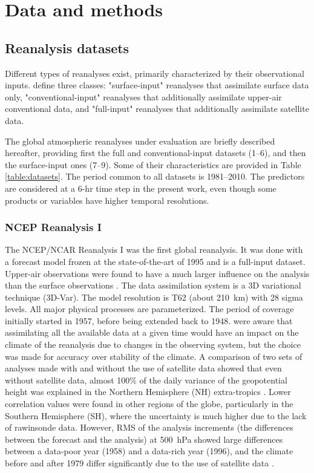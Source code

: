 \documentclass{ametsoc}
\begin{document}
	
	\section{Data and methods}
	\label{sec:data}
	
	\subsection{Reanalysis datasets}
	
	Different types of reanalyses exist, primarily characterized by their observational inputs. \citet{Fujiwara2017} define three classes: "surface-input" reanalyses that assimilate surface data only, "conventional-input" reanalyses that additionally assimilate upper-air conventional data, and "full-input" reanalyses that additionally assimilate satellite data.
	
	The global atmospheric reanalyses under evaluation are briefly described hereafter, providing first the full and conventional-input datasets (1--6), and then the surface-input ones (7--9). Some of their characteristics are provided in Table \ref{table:datasets}. The period common to all datasets is 1981--2010. The predictors are considered at a 6-hr time step in the present work, even though some products or variables have higher temporal resolutions.
	
	
	\subsubsection{NCEP Reanalysis I}
	
	The NCEP/NCAR Reanalysis I \citep[NR-1 --][]{Kalnay1996, Kistler2001} was the first global reanalysis. It was done with a forecast model frozen at the state-of-the-art of 1995 and is a full-input dataset. Upper-air observations were found to have a much larger influence on the analysis than the surface observations \citep{Kistler2001}. The data assimilation system is a 3D variational technique (3D-Var). The model resolution is T62 (about 210~km) with 28 sigma levels. All major physical processes are parameterized. The period of coverage initially started in 1957, before being extended back to 1948. \citet{Kalnay1996} were aware that assimilating all the available data at a given time would have an impact on the climate of the reanalysis due to changes in the observing system, but the choice was made for accuracy over stability of the climate. A comparison of two sets of analyses made with and without the use of satellite data showed that even without satellite data, almost 100\% of the daily variance of the geopotential height was explained in the Northern Hemisphere (NH) extra-tropics \citep{Kalnay1996}. Lower correlation values were found in other regions of the globe, particularly in the Southern Hemisphere (SH), where the uncertainty is much higher due to the lack of rawinsonde data. However, RMS of the analysis increments (the differences between the forecast and the analysis) at 500~hPa showed large differences between a data-poor year (1958) and a data-rich year (1996), and the climate before and after 1979 differ significantly due to the use of satellite data \citep{Kistler2001}.
	
\end{document}
